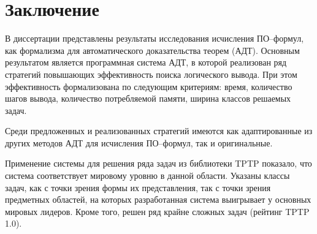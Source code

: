 \chapter*{Заключение}

В диссертации представлены результаты исследования исчисления ПО--формул, как формализма для автоматического доказательства теорем (АДТ). Основным результатом является программная система АДТ, в которой реализован ряд стратегий повышающих эффективность поиска логического вывода. При этом эффективность формализована по следующим критериям: время, количество шагов вывода, количество потребляемой памяти, ширина классов решаемых задач.

Среди предложенных и реализованных стратегий имеются как адаптированные из других методов АДТ для исчисления ПО--формул, так и оригинальные.

Применение системы для решения ряда задач из библиотеки TPTP показало, что система соответствует мировому уровню в данной области. Указаны классы задач, как с точки зрения формы их представления, так с точки зрения предметных областей, на которых разработанная система выигрывает у основных мировых лидеров. Кроме того, решен ряд крайне сложных задач (рейтинг TPTP 1.0).



